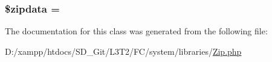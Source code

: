 \subsubsection[{\$zipdata}]{\setlength{\rightskip}{0pt plus 5cm}\$zipdata = \textquotesingle{}\textquotesingle{}}\label{class_c_i___zip_a395accfd5884d9a0e6fd53470b3e85b1}


The documentation for this class was generated from the following file\+:\begin{DoxyCompactItemize}
\item 
D\+:/xampp/htdocs/\+S\+D\+\_\+\+Git/\+L3\+T2/\+F\+C/system/libraries/\hyperlink{_zip_8php}{Zip.\+php}\end{DoxyCompactItemize}
